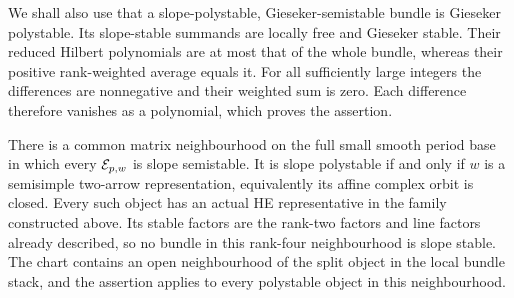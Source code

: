 We shall also use that a slope-polystable,
Gieseker-semistable bundle is Gieseker polystable.
Its slope-stable summands are locally free and Gieseker
stable. Their reduced Hilbert polynomials are at most
that of the whole bundle, whereas their positive
rank-weighted average equals it. For all sufficiently
large integers the differences are nonnegative and their
weighted sum is zero. Each difference therefore vanishes
as a polynomial, which proves the assertion.

\begin{theorem}\label{thm:local-polystability}
There is a common matrix neighbourhood on the full small
smooth period base in which every $\mathcal E_{p,w}$ is slope
semistable. It is slope polystable if and only if $w$ is
a semisimple two-arrow representation, equivalently its
affine complex orbit is closed. Every such object has an
actual HE representative in the family constructed above.
Its stable factors are the rank-two factors and line
factors already described, so no bundle in this rank-four
neighbourhood is slope stable. The chart contains an open
neighbourhood of the split object in the local bundle
stack, and the assertion applies to every polystable
object in this neighbourhood.
\end{theorem}

